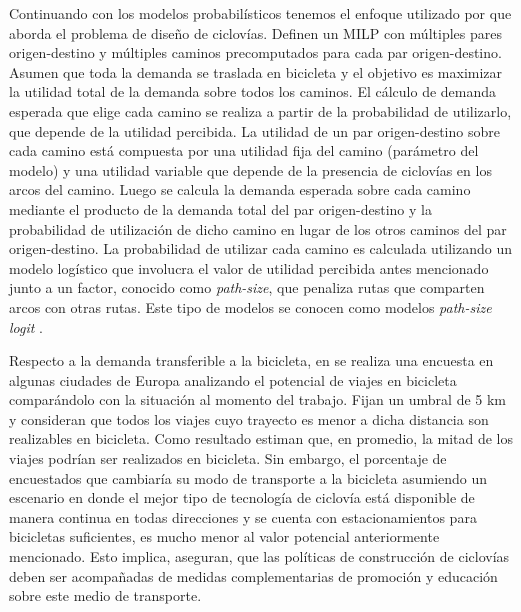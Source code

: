   Continuando con los modelos probabilísticos tenemos el enfoque utilizado por \textcite{Liu2019} que aborda el problema de diseño de ciclovías. Definen un MILP con múltiples pares origen-destino y múltiples caminos precomputados para cada par origen-destino. Asumen que toda la demanda se traslada en bicicleta y el objetivo es maximizar la utilidad total de la demanda sobre todos los caminos. El cálculo de demanda esperada que elige cada camino se realiza a partir de la probabilidad de utilizarlo, que depende de la utilidad percibida. La utilidad de un par origen-destino sobre cada camino está compuesta por una utilidad fija del camino (parámetro del modelo) y una utilidad variable que depende de la presencia de ciclovías en los arcos del camino. Luego se calcula la demanda esperada sobre cada camino mediante el producto de la demanda total del par origen-destino y la probabilidad de utilización de dicho camino en lugar de los otros caminos del par origen-destino. La probabilidad de utilizar cada camino es calculada utilizando un modelo logístico que involucra el valor de utilidad percibida antes mencionado junto a un factor, conocido como {\it path-size}, que penaliza rutas que comparten arcos con otras rutas. Este tipo de modelos se conocen como modelos {\it path-size logit} \parencite{benakiva1999}.

  Respecto a la demanda transferible a la bicicleta, en \parencite{shwe2014} se realiza una encuesta en algunas ciudades de Europa analizando el potencial de viajes en bicicleta comparándolo con la situación al momento del trabajo. Fijan un umbral de 5 km y consideran que todos los viajes cuyo trayecto es menor a dicha distancia son realizables en bicicleta. Como resultado estiman que, en promedio, la mitad de los viajes podrían ser realizados en bicicleta. Sin embargo, el porcentaje de encuestados que cambiaría su modo de transporte a la bicicleta asumiendo un escenario en donde el mejor tipo de tecnología de ciclovía está disponible de manera continua en todas direcciones y se cuenta con estacionamientos para bicicletas suficientes, es mucho menor al valor potencial anteriormente mencionado. Esto implica, aseguran, que las políticas de construcción de ciclovías deben ser acompañadas de medidas complementarias de promoción y educación sobre este medio de transporte.



